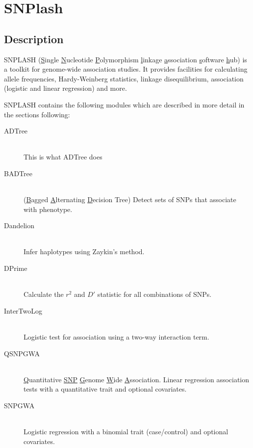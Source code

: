 \section{SNPlash}
\label{sec:snplash}

\subsection{Description}
SNPLASH (\underline{S}ingle \underline{N}ucleotide \underline{P}olymorphism
\underline{l}inkage \underline{a}ssociation \underline{s}oftware
\underline{h}ub) is a toolkit for genome-wide association studies.  It provides
facilities for calculating allele frequencies, Hardy-Weinberg statistics,
linkage disequilibrium, association (logistic and linear regression) and more.

SNPLASH contains the following modules which are described in more detail in the
sections following:

\begin{description}

  \item[ADTree]  \hfill \\
    This is what ADTree does

  \item[BADTree] \hfill \\
    (\underline{B}agged \underline{A}lternating \underline{D}ecision Tree)
    Detect sets of SNPs that associate with phenotype.

  \item[Dandelion] \hfill \\
    Infer haplotypes using Zaykin's method\cite{Zaykin02}.

  \item[DPrime] \hfill \\
    Calculate the $r^2$ and $D'$ statistic for all combinations of SNPs.

  \item[InterTwoLog] \hfill \\
    Logistic test for association using a two-way interaction term.

  \item[QSNPGWA] \hfill \\
    \underline{Q}uantitative \underline{SNP} \underline{G}enome \underline{W}ide
    \underline{A}ssociation.  Linear regression association tests with a
    quantitative trait and optional covariates.

  \item[SNPGWA] \hfill \\
    Logistic regression with a binomial trait (case/control) and optional
    covariates. 

\end{description}

